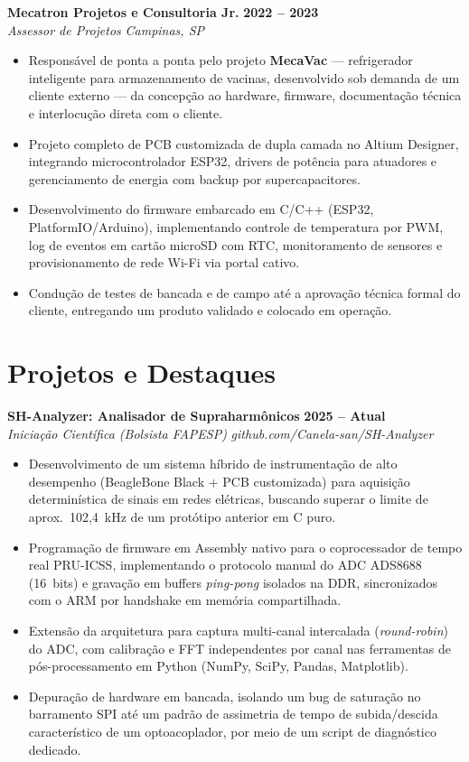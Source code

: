 \documentclass[a4paper,11pt]{article}
\newcommand{\entry}[4]{%
  \noindent\textbf{#1} \hfill \textbf{#2}\\
  \textit{#3} \hfill \textit{#4}
  \vspace{3pt}
}
\newcommand{\entrygap}{\vspace{9pt}}
\begin{document}
\entry{Mecatron Projetos e Consultoria Jr.}{2022 -- 2023}{Assessor de Projetos}{Campinas, SP}
\begin{itemize}
\item Responsável de ponta a ponta pelo projeto \textbf{MecaVac} --- refrigerador inteligente para armazenamento de vacinas, desenvolvido sob demanda de um cliente externo --- da concepção ao hardware, firmware, documentação técnica e interlocução direta com o cliente.
\item Projeto completo de PCB customizada de dupla camada no Altium Designer, integrando microcontrolador ESP32, drivers de potência para atuadores e gerenciamento de energia com backup por supercapacitores.
\item Desenvolvimento do firmware embarcado em C/C++ (ESP32, PlatformIO/Arduino), implementando controle de temperatura por PWM, log de eventos em cartão microSD com RTC, monitoramento de sensores e provisionamento de rede Wi-Fi via portal cativo.
\item Condução de testes de bancada e de campo até a aprovação técnica formal do cliente, entregando um produto validado e colocado em operação.
\end{itemize}
\entrygap

\section*{Projetos e Destaques}

\entry{SH-Analyzer: Analisador de Supraharmônicos}{2025 -- Atual}{Iniciação Científica (Bolsista FAPESP)}{github.com/Canela-san/SH-Analyzer}
\begin{itemize}
\item Desenvolvimento de um sistema híbrido de instrumentação de alto desempenho (BeagleBone Black + PCB customizada) para aquisição determinística de sinais em redes elétricas, buscando superar o limite de aprox.\ 102,4~kHz de um protótipo anterior em C puro.
\item Programação de firmware em Assembly nativo para o coprocessador de tempo real PRU-ICSS, implementando o protocolo manual do ADC ADS8688 (16~bits) e gravação em buffers \textit{ping-pong} isolados na DDR, sincronizados com o ARM por handshake em memória compartilhada.
\item Extensão da arquitetura para captura multi-canal intercalada (\textit{round-robin}) do ADC, com calibração e FFT independentes por canal nas ferramentas de pós-processamento em Python (NumPy, SciPy, Pandas, Matplotlib).
\item Depuração de hardware em bancada, isolando um bug de saturação no barramento SPI até um padrão de assimetria de tempo de subida/descida característico de um optoacoplador, por meio de um script de diagnóstico dedicado.
\end{itemize}
\entrygap
\end{document}
